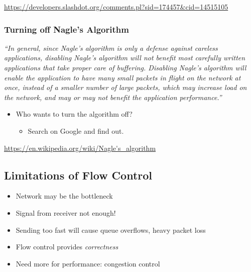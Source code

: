 \url{https://developers.slashdot.org/comments.pl?sid=174457&cid=14515105}

\subsubsection{Turning off Nagle's Algorithm}
\emph{``In general, since Nagle's algorithm is only a defense against careless applications, disabling Nagle’s algorithm will not benefit most carefully written applications that take proper care of buffering. Disabling Nagle’s algorithm will enable the application to have many small packets in flight on the network at once, instead of a smaller number of large packets, which may increase load on the network, and may or may not benefit the application performance.''}

\begin{itemize}
    \item Who wants to turn the algorithm off?
          \begin{itemize}
              \item Search on Google and find out.
          \end{itemize}
\end{itemize}
\url{https://en.wikipedia.org/wiki/Nagle's_algorithm}

\subsection{Limitations of Flow Control}
\begin{itemize}
    \item Network may be the bottleneck
    \item Signal from receiver not enough!
    \item Sending too fast will cause queue overflows, heavy packet loss
    \item Flow control provides \emph{correctness}
    \item Need more for performance: congestion control
\end{itemize}

